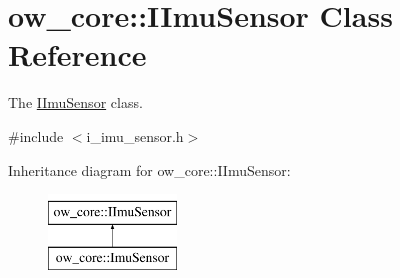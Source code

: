 \hypertarget{classow__core_1_1IImuSensor}{}\section{ow\+\_\+core\+:\+:I\+Imu\+Sensor Class Reference}
\label{classow__core_1_1IImuSensor}


The \hyperlink{classow__core_1_1IImuSensor}{I\+Imu\+Sensor} class.  




{\ttfamily \#include $<$i\+\_\+imu\+\_\+sensor.\+h$>$}

Inheritance diagram for ow\+\_\+core\+:\+:I\+Imu\+Sensor\+:\begin{figure}[H]
\begin{center}
\leavevmode
\includegraphics[height=2.000000cm]{dc/dc5/classow__core_1_1IImuSensor}
\end{center}
\end{figure}
